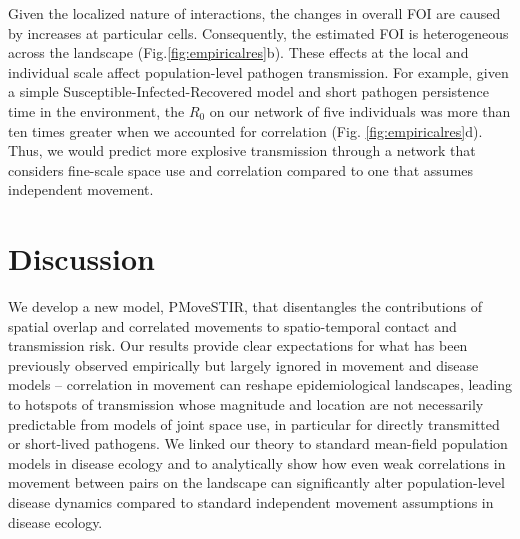 \documentclass[letterpaper]{article}
\begin{document}
Given the localized nature of interactions, the changes in overall FOI are caused by increases at particular cells. Consequently, the estimated FOI is heterogeneous across the landscape (Fig.\ref{fig:empiricalres}b). These effects at the local and individual scale affect population-level pathogen transmission. For example, given a simple Susceptible-Infected-Recovered model and short pathogen persistence time in the environment, the $R_0$ on our network of five individuals was more than ten times greater when we accounted for correlation (Fig. \ref{fig:empiricalres}d). Thus, we would predict more explosive transmission through a network that considers fine-scale space use and correlation compared to one that assumes independent movement.

\section*{Discussion}

We develop a new model, PMoveSTIR, that disentangles the contributions of spatial overlap and correlated movements to spatio-temporal contact and transmission risk.   Our results provide clear expectations for what has been previously observed empirically but largely ignored in movement and disease models -- correlation in movement can reshape epidemiological landscapes, leading to hotspots of transmission whose magnitude and location are not necessarily predictable from models of joint space use, in particular for directly transmitted or short-lived pathogens.  We linked our theory to standard mean-field population models in disease ecology and to analytically show how even weak correlations in movement between pairs on the landscape can significantly alter population-level disease dynamics compared to standard independent movement assumptions in disease ecology.

\end{document}
